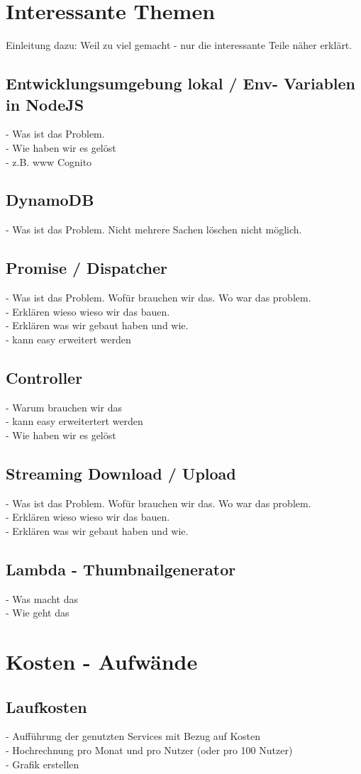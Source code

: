 \documentclass[a4paper, 10pt]{scrreprt}
\begin{document}
\chapter{Interessante Themen}
Einleitung dazu: Weil zu viel gemacht - nur die interessante Teile näher erklärt.

\section{Entwicklungsumgebung lokal / Env- Variablen in NodeJS}
- Was ist das Problem.\\ 
- Wie haben wir es gelöst\\
-  z.B. www Cognito

\section{DynamoDB}
- Was ist das Problem. Nicht mehrere Sachen löschen nicht möglich. 

\section{Promise / Dispatcher}
- Was ist das Problem. Wofür brauchen wir das. Wo war das problem.\\
- Erklären wieso wieso wir das bauen.\\
- Erklären was wir gebaut haben und wie.\\
- kann easy erweitert werden

\section{Controller}
- Warum brauchen wir das\\
- kann easy erweitertert werden\\
- Wie haben wir es gelöst

\section{Streaming Download / Upload}
- Was ist das Problem. Wofür brauchen wir das. Wo war das problem.\\
- Erklären wieso wieso wir das bauen.\\
- Erklären was wir gebaut haben und wie.

\section{Lambda - Thumbnailgenerator}
- Was macht das\\
- Wie geht das

\chapter{Kosten - Aufwände}

\section{Laufkosten}
- Aufführung der genutzten Services mit Bezug auf Kosten\\
- Hochrechnung pro Monat und pro Nutzer (oder pro 100 Nutzer) \\
- Grafik erstellen







\clearpage

%
\end{document}
